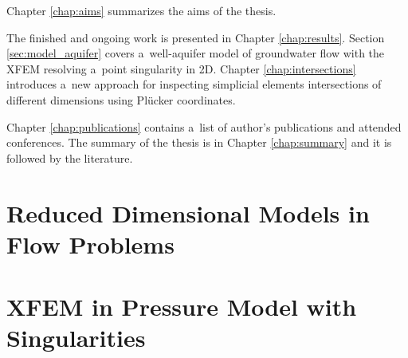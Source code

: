 \documentclass[bibliography=totocnumbered,dvipsnames,FM,Dis]{tulthesis}
\begin{document}
Chapter \ref{chap:aims} summarizes the aims of the thesis.

The finished and ongoing work is presented in Chapter \ref{chap:results}. Section \ref{sec:model_aquifer} 
covers a~well-aquifer model of groundwater flow with the XFEM resolving a~point singularity in 2D.
Chapter \ref{chap:intersections} introduces a~new approach for inspecting simplicial elements intersections
of different dimensions using Pl{\"u}cker coordinates.

Chapter \ref{chap:publications} contains a~list of author's publications and attended conferences.
The summary of the thesis is in Chapter \ref{chap:summary} and it is followed by the literature.




\chapter{Reduced Dimensional Models in Flow Problems} \label{chap:reduced}







\chapter{XFEM in Pressure Model with Singularities} \label{chap:xfem_pressure}







\end{document}
